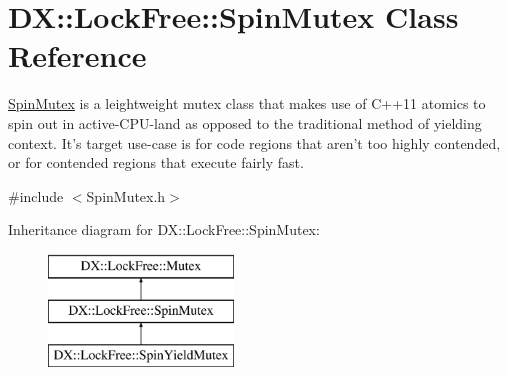 \hypertarget{class_d_x_1_1_lock_free_1_1_spin_mutex}{\section{D\-X\-:\-:Lock\-Free\-:\-:Spin\-Mutex Class Reference}
\label{class_d_x_1_1_lock_free_1_1_spin_mutex}
}


\hyperlink{class_d_x_1_1_lock_free_1_1_spin_mutex}{Spin\-Mutex} is a leightweight mutex class that makes use of C++11 atomics to spin out in active-\/\-C\-P\-U-\/land as opposed to the traditional method of yielding context. It's target use-\/case is for code regions that aren't too highly contended, or for contended regions that execute fairly fast.  




{\ttfamily \#include $<$Spin\-Mutex.\-h$>$}

Inheritance diagram for D\-X\-:\-:Lock\-Free\-:\-:Spin\-Mutex\-:\begin{figure}[H]
\begin{center}
\leavevmode
\includegraphics[height=3.000000cm]{class_d_x_1_1_lock_free_1_1_spin_mutex}
\end{center}
\end{figure}
